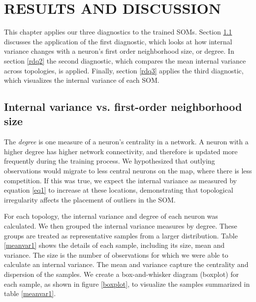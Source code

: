 \chapter{RESULTS AND DISCUSSION}
This chapter applies our three diagnostics to the trained SOMs.  Section
\ref{rdq1} discusses the application of the first diagnostic, which looks at how internal variance
changes with a neuron's first order neighborhood size, or degree.  In section
\ref{rdq2} the second diagnostic, which compares the mean
internal variance across topologies, is applied.  Finally, section \ref{rdq3} applies the
third diagnostic, which visualizes the internal variance of each SOM.


\section{Internal variance vs. first-order neighborhood size}
\label{rdq1}
The \emph{degree} is one measure of a neuron's centrality in a network. A
neuron with a higher degree has higher network connectivity, and therefore is
updated more frequently during the training process.  We hypothesized that
outlying observations would migrate to less central neurons on the map, where
there is less competition.  If this was true, we expect the internal variance
as measured by equation \ref{eq1} to increase at these locations,
demonstrating that topological irregularity affects the placement of outliers
in the SOM.  

For each topology, the internal variance and degree of each neuron was
calculated. We then grouped the internal variance measures by degree.  These groups are
treated as representative samples from a larger distribution. Table \ref{meanvar1}
shows the details of each sample, including its size, mean and variance. 
The size is the number of observations for which we were able to calculate an
internal variance. The mean and variance capture the centrality and
dispersion of the samples.  We create a box-and-whisker diagram (boxplot) for
each sample, as shown in figure \ref{boxplot}, to visualize the samples
summarized in table \ref{meanvar1}.

